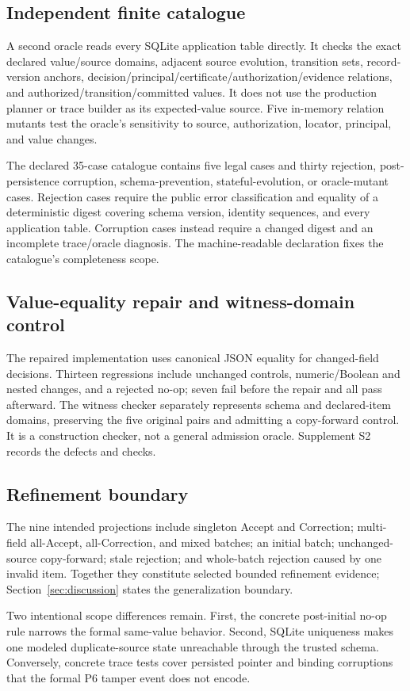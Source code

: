 \subsection{Independent finite catalogue}

A second oracle reads every SQLite application table directly. It checks the exact declared value/source domains, adjacent source evolution, transition sets, record-version anchors, decision/principal/certificate/authorization/evidence relations, and authorized/transition/committed values. It does not use the production planner or trace builder as its expected-value source. Five in-memory relation mutants test the oracle's sensitivity to source, authorization, locator, principal, and value changes.

The declared 35-case catalogue contains five legal cases and thirty rejection, post-persistence corruption, schema-prevention, stateful-evolution, or oracle-mutant cases. Rejection cases require the public error classification and equality of a deterministic digest covering schema version, identity sequences, and every application table. Corruption cases instead require a changed digest and an incomplete trace/oracle diagnosis. The machine-readable declaration fixes the catalogue's completeness scope.

\subsection{Value-equality repair and witness-domain control}

The repaired implementation uses canonical JSON equality for changed-field decisions. Thirteen regressions include unchanged controls, numeric/Boolean and nested changes, and a rejected no-op; seven fail before the repair and all pass afterward. The witness checker separately represents schema and declared-item domains, preserving the five original pairs and admitting a copy-forward control. It is a construction checker, not a general admission oracle. Supplement S2 records the defects and checks.

\subsection{Refinement boundary}

The nine intended projections include singleton Accept and Correction; multi-field all-Accept, all-Correction, and mixed batches; an initial batch; unchanged-source copy-forward; stale rejection; and whole-batch rejection caused by one invalid item. Together they constitute selected bounded refinement evidence; Section~\ref{sec:discussion} states the generalization boundary.

Two intentional scope differences remain. First, the concrete post-initial no-op rule narrows the formal same-value behavior. Second, SQLite uniqueness makes one modeled duplicate-source state unreachable through the trusted schema. Conversely, concrete trace tests cover persisted pointer and binding corruptions that the formal P6 tamper event does not encode.
